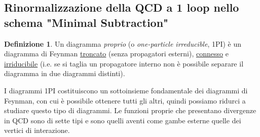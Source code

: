\documentclass[12pt,a4paper]{article}
\theoremstyle{definition}
\newtheorem{dfn}{Definizione}[section]
\numberwithin{equation}{section}
\begin{document}
\subsection{Rinormalizzazione della QCD a 1 loop nello schema "Minimal Subtraction"}
\begin{dfn}
Un diagramma \emph{proprio} (o \emph{one-particle irreducible}, 1PI) è un diagramma di Feynman \underline{troncato} (senza propagatori esterni), \underline{connesso} e \underline{irriducibile} (i.e. se si taglia un propagatore interno non è possibile separare il diagramma in due diagrammi distinti).
\end{dfn}

I diagrammi 1PI costituiscono un sottoinsieme fondamentale dei diagrammi di Feynman, con cui è possibile ottenere tutti gli altri, quindi possiamo ridurci a studiare questo tipo di diagrammi. Le funzioni proprie che presentano divergenze in QCD sono di sette tipi e sono quelli aventi come gambe esterne quelle dei vertici di interazione.
\end{document}

